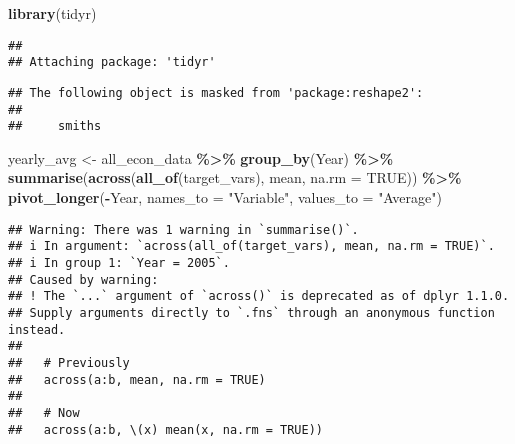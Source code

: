 \documentclass[
]{article}
\newenvironment{Shaded}{\begin{snugshade}}{\end{snugshade}}
\newcommand{\AttributeTok}[1]{\textcolor[rgb]{0.13,0.29,0.53}{#1}}
\newcommand{\ConstantTok}[1]{\textcolor[rgb]{0.56,0.35,0.01}{#1}}
\newcommand{\FunctionTok}[1]{\textcolor[rgb]{0.13,0.29,0.53}{\textbf{#1}}}
\newcommand{\NormalTok}[1]{#1}
\newcommand{\OtherTok}[1]{\textcolor[rgb]{0.56,0.35,0.01}{#1}}
\newcommand{\SpecialCharTok}[1]{\textcolor[rgb]{0.81,0.36,0.00}{\textbf{#1}}}
\newcommand{\StringTok}[1]{\textcolor[rgb]{0.31,0.60,0.02}{#1}}
\begin{document}
\begin{Shaded}
\begin{Highlighting}[]
\FunctionTok{library}\NormalTok{(tidyr)}
\end{Highlighting}
\end{Shaded}

\begin{verbatim}
## 
## Attaching package: 'tidyr'
\end{verbatim}

\begin{verbatim}
## The following object is masked from 'package:reshape2':
## 
##     smiths
\end{verbatim}

\begin{Shaded}
\begin{Highlighting}[]
\NormalTok{yearly\_avg }\OtherTok{\textless{}{-}}\NormalTok{ all\_econ\_data }\SpecialCharTok{\%\textgreater{}\%}
  \FunctionTok{group\_by}\NormalTok{(Year) }\SpecialCharTok{\%\textgreater{}\%}
  \FunctionTok{summarise}\NormalTok{(}\FunctionTok{across}\NormalTok{(}\FunctionTok{all\_of}\NormalTok{(target\_vars), mean, }\AttributeTok{na.rm =} \ConstantTok{TRUE}\NormalTok{)) }\SpecialCharTok{\%\textgreater{}\%}
  \FunctionTok{pivot\_longer}\NormalTok{(}\SpecialCharTok{{-}}\NormalTok{Year, }\AttributeTok{names\_to =} \StringTok{"Variable"}\NormalTok{, }\AttributeTok{values\_to =} \StringTok{"Average"}\NormalTok{)}
\end{Highlighting}
\end{Shaded}

\begin{verbatim}
## Warning: There was 1 warning in `summarise()`.
## i In argument: `across(all_of(target_vars), mean, na.rm = TRUE)`.
## i In group 1: `Year = 2005`.
## Caused by warning:
## ! The `...` argument of `across()` is deprecated as of dplyr 1.1.0.
## Supply arguments directly to `.fns` through an anonymous function instead.
## 
##   # Previously
##   across(a:b, mean, na.rm = TRUE)
## 
##   # Now
##   across(a:b, \(x) mean(x, na.rm = TRUE))
\end{verbatim}
\end{document}
